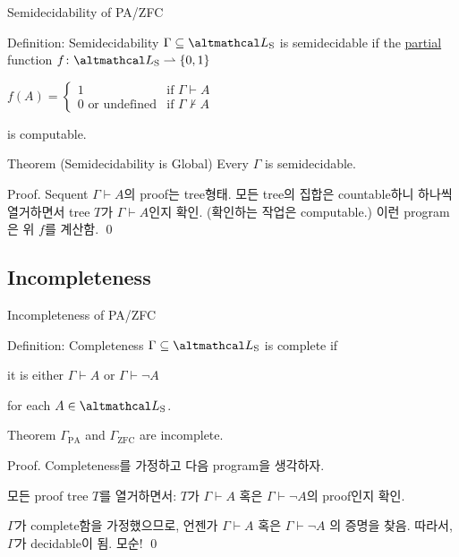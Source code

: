 \documentclass[../231120_msquare_computational-logic.tex]{subfiles}
\begin{document}
\begin{frame}{Semidecidability of PA/ZFC}
    \begin{block}{Definition: Semidecidability}
        \(\Gamma \subseteq \LS\) is semidecidable if the \ul{partial} function \(f \colon \LS \rightharpoonup \{0,1\}\)
        \centerline{
            \(f(A) = \begin{cases}
                1 & \text{if } \Gamma \vdash A \\
                0 \text{ or undefined} & \text{if }\Gamma \not\vdash A
            \end{cases}\)
        }
        is computable.
    \end{block}
    \pause

    \begin{block}{Theorem (Semidecidability is Global)}
        Every \(\Gamma\) is semidecidable.
    \end{block}
    \begin{block}{Proof.}
        Sequent \(\Gamma \vdash A\)의 proof는 tree형태.
        모든 tree의 집합은 countable하니 하나씩 열거하면서
        tree \(T\)가 \(\Gamma \vdash A\)인지 확인. (확인하는 작업은 computable.)
        이런 program은 위 \(f\)를 계산함. \qed
    \end{block}
\end{frame}

\subsection{Incompleteness}
\begin{frame}{Incompleteness of PA/ZFC}
    \begin{block}{Definition: Completeness}
        \(\Gamma \subseteq \LS\) is complete if
        \begin{itemize}
            \ii it is either \(\Gamma \vdash A\) or \(\Gamma \vdash \lnot A\)
        \end{itemize}
        for each \(A \in \LS\).
    \end{block}
    \pause

    \begin{block}{Theorem}
        \(\Gamma_\text{PA}\) and \(\Gamma_\text{ZFC}\) are incomplete.
    \end{block}
    \pause
    \begin{block}{Proof.}
        Completeness를 가정하고 다음 program을 생각하자.
        \begin{itemize}
            \ii 모든 proof tree \(T\)를 열거하면서:
            \ii \(T\)가 \(\Gamma \vdash A\) 혹은 \(\Gamma \vdash \lnot A\)의 proof인지 확인.
        \end{itemize}
        \(\Gamma\)가 complete함을 가정했으므로,
        언젠가 \(\Gamma \vdash A\) 혹은 \(\Gamma \vdash \lnot A\) 의 증명을 찾음.
        따라서, \(\Gamma\)가 decidable이 됨. 모순! \qed
    \end{block}
\end{frame}
\end{document}
